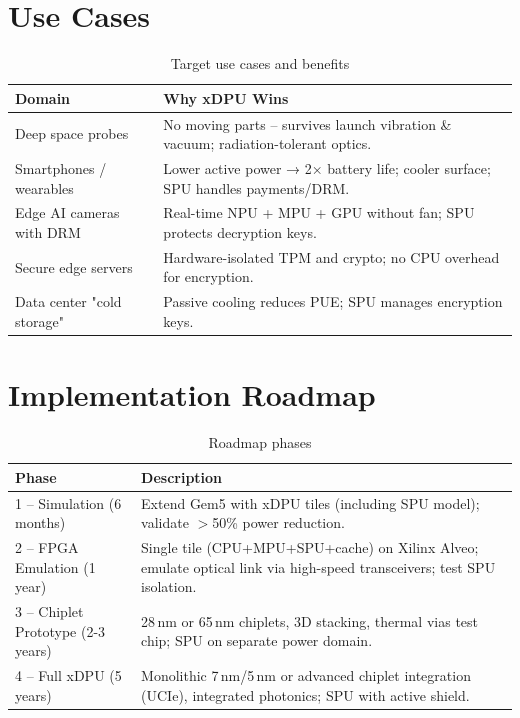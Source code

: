\documentclass[10pt,twocolumn]{article}
\begin{document}
\section{Use Cases}

\begin{table}[ht]
\centering
\caption{Target use cases and benefits}
\label{tab:usecases}
\begin{tabular}{@{}lp{6cm}@{}}
\toprule
\textbf{Domain} & \textbf{Why xDPU Wins} \\
\midrule
Deep space probes & No moving parts – survives launch vibration \& vacuum; radiation-tolerant optics. \\
Smartphones / wearables & Lower active power → 2× battery life; cooler surface; SPU handles payments/DRM. \\
Edge AI cameras with DRM & Real-time NPU + MPU + GPU without fan; SPU protects decryption keys. \\
Secure edge servers & Hardware-isolated TPM and crypto; no CPU overhead for encryption. \\
Data center "cold storage" & Passive cooling reduces PUE; SPU manages encryption keys. \\
\bottomrule
\end{tabular}
\end{table}

\section{Implementation Roadmap}

\begin{table}[ht]
\centering
\caption{Roadmap phases}
\label{tab:roadmap}
\begin{tabular}{@{}lp{7cm}@{}}
\toprule
\textbf{Phase} & \textbf{Description} \\
\midrule
1 – Simulation (6 months) & Extend Gem5 with xDPU tiles (including SPU model); validate \(>\)50\% power reduction. \\
2 – FPGA Emulation (1 year) & Single tile (CPU+MPU+SPU+cache) on Xilinx Alveo; emulate optical link via high-speed transceivers; test SPU isolation. \\
3 – Chiplet Prototype (2-3 years) & 28 nm or 65 nm chiplets, 3D stacking, thermal vias test chip; SPU on separate power domain. \\
4 – Full xDPU (5 years) & Monolithic 7 nm/5 nm or advanced chiplet integration (UCIe), integrated photonics; SPU with active shield. \\
\bottomrule
\end{tabular}
\end{table}
\end{document}
